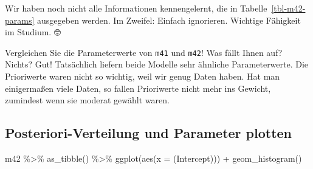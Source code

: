 \documentclass[
  a4paper,
  DIV=11]{scrreprt}
\newenvironment{Shaded}{\begin{snugshade}}{\end{snugshade}}
\newcommand{\AttributeTok}[1]{\textcolor[rgb]{0.40,0.45,0.13}{#1}}
\newcommand{\FunctionTok}[1]{\textcolor[rgb]{0.28,0.35,0.67}{#1}}
\newcommand{\NormalTok}[1]{\textcolor[rgb]{0.00,0.23,0.31}{#1}}
\newcommand{\SpecialCharTok}[1]{\textcolor[rgb]{0.37,0.37,0.37}{#1}}
\newcommand{\StringTok}[1]{\textcolor[rgb]{0.13,0.47,0.30}{#1}}
\theoremstyle{definition}
\theoremstyle{remark}
\begin{document}
Wir haben noch nicht alle Informationen kennengelernt, die in
Tabelle~\ref{tbl-m42-params} ausgegeben werden. Im Zweifel: Einfach
ignorieren. Wichtige Fähigkeit im Studium. 🤓

\begin{tcolorbox}[enhanced jigsaw, title=\textcolor{quarto-callout-important-color}{\faExclamation}\hspace{0.5em}{Wichtig}, bottomtitle=1mm, bottomrule=.15mm, titlerule=0mm, colbacktitle=quarto-callout-important-color!10!white, colframe=quarto-callout-important-color-frame, leftrule=.75mm, left=2mm, toprule=.15mm, colback=white, arc=.35mm, breakable, toptitle=1mm, opacityback=0, rightrule=.15mm, coltitle=black, opacitybacktitle=0.6]

Vergleichen Sie die Parameterwerte von \texttt{m41} und \texttt{m42}!
Was fällt Ihnen auf? Nichts? Gut! Tatsächlich liefern beide Modelle sehr
ähnliche Parameterwerte. Die Prioriwerte waren nicht so wichtig, weil
wir genug Daten haben. Hat man einigermaßen viele Daten, so fallen
Prioriwerte nicht mehr ins Gewicht, zumindest wenn sie moderat gewählt
waren.

\end{tcolorbox}

\hypertarget{posteriori-verteilung-und-parameter-plotten}{%
\subsection{Posteriori-Verteilung und Parameter
plotten}\label{posteriori-verteilung-und-parameter-plotten}}

\begin{Shaded}
\begin{Highlighting}[]
\NormalTok{m42 }\SpecialCharTok{\%\textgreater{}\%} 
  \FunctionTok{as\_tibble}\NormalTok{() }\SpecialCharTok{\%\textgreater{}\%} 
  \FunctionTok{ggplot}\NormalTok{(}\FunctionTok{aes}\NormalTok{(}\AttributeTok{x =} \StringTok{\textasciigrave{}}\AttributeTok{(Intercept)}\StringTok{\textasciigrave{}}\NormalTok{)) }\SpecialCharTok{+}
  \FunctionTok{geom\_histogram}\NormalTok{()}
\end{Highlighting}
\end{Shaded}
\end{document}
